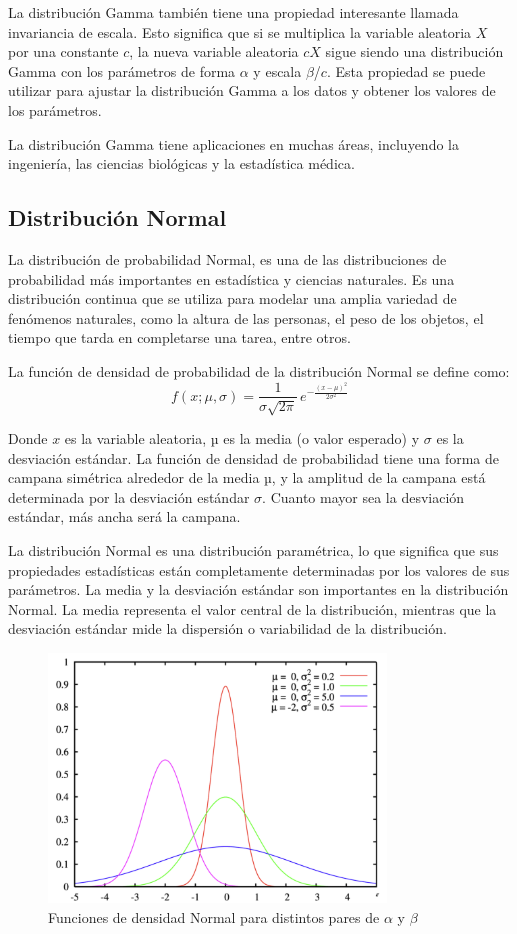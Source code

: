 \documentclass{article}
\begin{document}
 La distribución Gamma también tiene una propiedad interesante llamada invariancia de escala. Esto significa que si se multiplica la variable aleatoria $X$ por una constante $c$, la nueva variable aleatoria $cX$ sigue siendo una distribución Gamma con los parámetros de forma $\alpha$ y escala $\beta$/$c$. Esta propiedad se puede utilizar para ajustar la distribución Gamma a los datos y obtener los valores de los parámetros.
 
 La distribución Gamma tiene aplicaciones en muchas áreas, incluyendo la ingeniería, las ciencias biológicas y la estadística médica.

 \subsection{Distribución Normal}
La distribución de probabilidad Normal, es una de las distribuciones de probabilidad más importantes en estadística y ciencias naturales. Es una distribución continua que se utiliza para modelar una amplia variedad de fenómenos naturales, como la altura de las personas, el peso de los objetos, el tiempo que tarda en completarse una tarea, entre otros.

La función de densidad de probabilidad de la distribución Normal se define como:
\begin{equation}
    f(x; \mu, \sigma) = \frac{1}{\sigma \sqrt{2\pi}} \, e^{-\frac{(x - \mu)^2}{2\sigma^2}}
\end{equation}

 Donde $x$ es la variable aleatoria, $µ$ es la media (o valor esperado) y $\sigma$ es la desviación estándar. La función de densidad de probabilidad tiene una forma de campana simétrica alrededor de la media $µ$, y la amplitud de la campana está determinada por la desviación estándar $\sigma$. Cuanto mayor sea la desviación estándar, más ancha será la campana. 
 
 La distribución Normal es una distribución paramétrica, lo que significa que sus propiedades estadísticas están completamente determinadas por los valores de sus parámetros. La media y la desviación estándar son importantes en la distribución Normal. La media representa el valor central de la distribución, mientras que la desviación estándar mide la dispersión o variabilidad de la distribución.
 
\begin{figure}[H]
    \centering
    \includegraphics[width=0.5\linewidth]{Imagenes/Funciones de densidad Normal para distintos pares de µ y σ.png}
    \caption{Funciones de densidad Normal para distintos pares de $\alpha$ y $\beta$}
    \label{fig:Func.Densidad Normal}
\end{figure}
\end{document}
